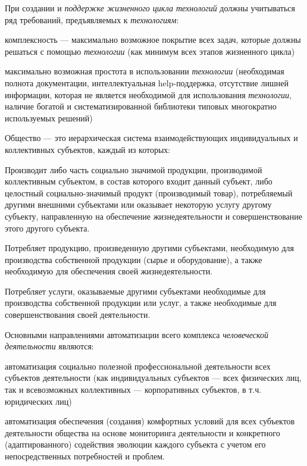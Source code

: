 При создании и \textit{поддержке жизненного цикла технологий} должны учитываться ряд требований, предъявляемых к  \textit{технологиям}:

\begin{textitemize}
	\item
	комплексность --- максимально возможное покрытие всех задач, которые должны решаться с помощью \textit{технологии} (как минимум всех этапов жизненного цикла)
	\item
	максимально возможная простота в использовании \textit{технологии} (необходимая полнота документации, интеллектуальная help-поддержка, отсутствие лишней информации, которая не является необходимой для использования \textit{технологии}, наличие богатой и систематизированной библиотеки типовых многократно используемых решений)
\end{textitemize}

Общество --- это иерархическая система взаимодействующих индивидуальных и коллективных субъектов, каждый из которых:

\begin{textitemize}
	\item
	Производит либо часть социально значимой продукции, производимой коллективным субъектом, в состав которого входит данный субъект, либо целостный социально-значимый продукт (производимый товар), потребляемый другими внешними субъектами или оказывает некоторую услугу другому субъекту, направленную на обеспечение жизнедеятельности и совершенствование этого другого субъекта.
	\item
	Потребляет продукцию, произведенную другими субъектами, необходимую для производства собственной продукции (сырье и оборудование), а также необходимую для обеспечения своей жизнедеятельности.
	\item
	Потребляет услуги, оказываемые другими субъектами необходимые для производства собственной продукции или услуг, а также необходимые для совершенствования своей деятельности.
\end{textitemize}

Основными направлениями автоматизации всего комплекса \textit{человеческой деятельности} являются:

\begin{textitemize}
	\item	
	автоматизация социально полезной профессиональной деятельности всех субъектов деятельности (как индивидуальных субъектов --- всех физических лиц, так и всевозможных коллективных --- корпоративных субъектов, в т.ч. юридических лиц)
	
	\item	
	автоматизация обеспечения (создания) комфортных условий для всех субъектов деятельности общества на основе мониторинга деятельности и конкретного (адаптированного) содействия эволюции каждого субъекта с учетом его непосредственных потребностей и проблем.
	
\end{textitemize}


